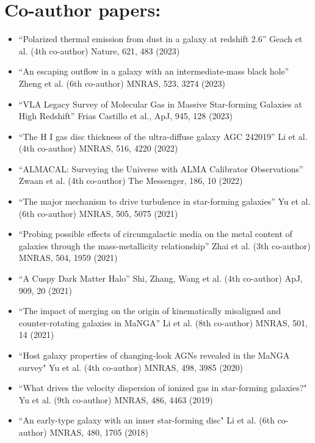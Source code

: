 \documentclass[A4,11pt]{article}
\newenvironment{paperlist}
{ \begin{itemize}[leftmargin=0.8cm, label={$\bullet$}]
    \setlength{\itemsep}{1pt}
    \setlength{\parskip}{1pt}
    \setlength{\parsep}{1pt}     }
{ \end{itemize}                  }
\begin{document}
\section{Co-author papers:}
\begin{paperlist}
    \item ``Polarized thermal emission from dust in a galaxy at redshift 2.6'' Geach et al. (4th co-author) Nature, 621, 483 (2023)
    \item ``An escaping outflow in a galaxy with an intermediate-mass black hole'' Zheng et al. (6th co-author) MNRAS, 523, 3274 (2023)
    \item ``VLA Legacy Survey of Molecular Gas in Massive Star-forming Galaxies at High Redshift'' Frias Castillo et al., ApJ, 945, 128 (2023)
    \item ``The H I gas disc thickness of the ultra-diffuse galaxy AGC 242019'' Li et al. (4th co-author) MNRAS, 516, 4220 (2022)
    \item ``ALMACAL: Surveying the Universe with ALMA Calibrator Observations'' Zwaan et al. (4th co-author) The Messenger, 186, 10 (2022)
    \item ``The major mechanism to drive turbulence in star-forming galaxies'' Yu et al. (6th co-author) MNRAS, 505, 5075 (2021)
    \item ``Probing possible effects of circumgalactic media on the metal content of galaxies through the mass-metallicity relationship'' Zhai et al. (3th co-author) MNRAS, 504, 1959 (2021)
    \item ``A Cuspy Dark Matter Halo” Shi, Zhang, Wang et al. (4th co-author) ApJ, 909, 20 (2021)
    \item ``The impact of merging on the origin of kinematically misaligned and counter-rotating galaxies in MaNGA'' Li et al. (8th co-author) MNRAS, 501, 14 (2021)
    \item ``Host galaxy properties of changing-look AGNs revealed in the MaNGA survey" Yu et al. (4th co-author) MNRAS, 498, 3985 (2020)
    \item ``What drives the velocity dispersion of ionized gas in star-forming galaxies?" Yu et al. (9th co-author) MNRAS, 486, 4463 (2019)
    \item ``An early-type galaxy with an inner star-forming disc" Li et al. (6th co-author) MNRAS, 480, 1705 (2018)
\end{paperlist}
\end{document}
